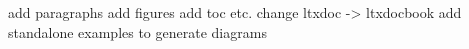 add paragraphs
add figures
add toc etc.
change ltxdoc  -> ltxdocbook
add standalone examples to generate diagrams





